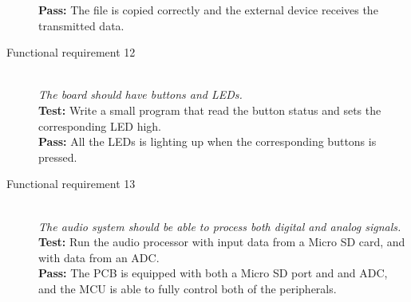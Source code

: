 \begin{description}
        \textbf{Pass:} The file is copied correctly and the external device receives the 
        transmitted data. 
    \item[Functional requirement 12] \hfill \\
        \textit{The board should have buttons and LEDs.} \\
        \textbf{Test:} Write a small program that read the button status and sets
        the corresponding LED high. \\
        \textbf{Pass:} All the LEDs is lighting up when the corresponding buttons is pressed.
    \item[Functional requirement 13] \hfill \\
        \textit{The audio system should be able to process both digital and analog signals.} \\
        \textbf{Test:} Run the audio processor with input data from a Micro SD card, and
        with data from an ADC. \\
        \textbf{Pass:} The PCB is equipped with both a Micro SD port and and ADC, and the
        MCU is able to fully control both of the peripherals.\\
\end{description}
